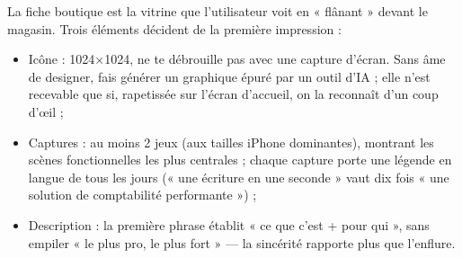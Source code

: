 
La fiche boutique est la vitrine que l'utilisateur voit en « flânant » devant le magasin. Trois éléments décident de la première impression :

\begin{itemize}
  \item Icône : 1024×1024, ne te débrouille pas avec une capture d'écran. Sans âme de designer, fais générer un graphique épuré par un outil d'IA ; elle n'est recevable que si, rapetissée sur l'écran d'accueil, on la reconnaît d'un coup d'œil ;
  \item Captures : au moins 2 jeux (aux tailles iPhone dominantes), montrant les scènes fonctionnelles les plus centrales ; chaque capture porte une légende en langue de tous les jours (« une écriture en une seconde » vaut dix fois « une solution de comptabilité performante ») ;
  \item Description : la première phrase établit « ce que c'est + pour qui », sans empiler « le plus pro, le plus fort » — la sincérité rapporte plus que l'enflure.
\end{itemize}

